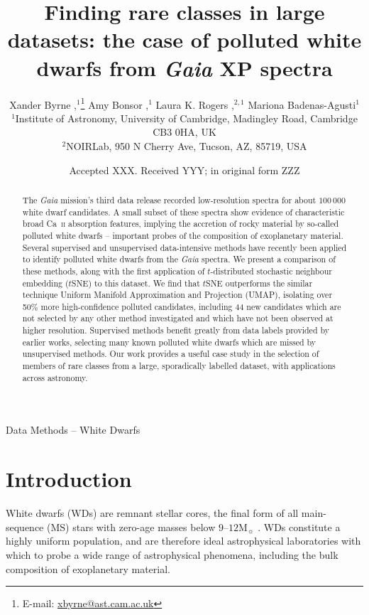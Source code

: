 \documentclass[fleqn,usenatbib]{rasti}
\title[
    Polluted white dwarfs from \textit{Gaia} XP spectra
]{
    Finding rare classes in large datasets: the case of polluted white dwarfs from \textit{Gaia} XP spectra
}
\author[
    X. Byrne et al.
]{
    Xander Byrne
    \orcidlink{0000-0001-9488-238X},$^{1}$\thanks{E-mail: \href{mailto:xbyrne@ast.cam.ac.uk}{xbyrne@ast.cam.ac.uk}}
    Amy Bonsor
    \orcidlink{0000-0002-8070-1901},$^{1}$
    Laura K. Rogers
    \orcidlink{0000-0002-3553-9474},$^{2,1}$
    Mariona Badenas-Agusti$^{1}$
    \orcidlink{0000-0003-4903-567X}
\\
$^{1}$Institute of Astronomy, University of Cambridge, Madingley Road, Cambridge CB3 0HA, UK\\
$^{2}$NOIRLab, 950 N Cherry Ave, Tucson, AZ, 85719, USA\\
}
\date{Accepted XXX. Received YYY; in original form ZZZ}
\begin{document}
\label{firstpage}
\pagerange{\pageref{firstpage}--\pageref{lastpage}}
\maketitle

\begin{abstract}
The \textit{Gaia} mission's third data release recorded low-resolution spectra for about $100\,000$ white dwarf candidates.
A small subset of these spectra show evidence of characteristic broad Ca~\textsc{ii} absorption features, implying the accretion of rocky material by so-called polluted white dwarfs -- important probes of the composition of exoplanetary material.
Several supervised and unsupervised data-intensive methods have recently been applied to identify polluted white dwarfs from the \textit{Gaia} spectra.
We present a comparison of these methods, along with the first application of $t$-distributed stochastic neighbour embedding ($t$SNE) to this dataset.
We find that $t$SNE outperforms the similar technique Uniform Manifold Approximation and Projection (UMAP), isolating over 50\% more high-confidence polluted candidates, including 44 new candidates which are not selected by any other method investigated and which have not been observed at higher resolution.
Supervised methods benefit greatly from data labels provided by earlier works, selecting many known polluted white dwarfs which are missed by unsupervised methods.
Our work provides a useful case study in the selection of members of rare classes from a large, sporadically labelled dataset, with applications across astronomy.
\end{abstract}

\begin{keywords}
Data Methods -- White Dwarfs
\end{keywords}



\section{Introduction}

White dwarfs (WDs) are remnant stellar cores, the final form of all main-sequence (MS) stars with zero-age masses below $9$--$12\mathrm{M}_{\sun}$ \citep{althaus10, althaus21, lauffer18}.
WDs constitute a highly uniform population, and are therefore ideal astrophysical laboratories with which to probe a wide range of astrophysical phenomena, including the bulk composition of exoplanetary material.
\end{document}
